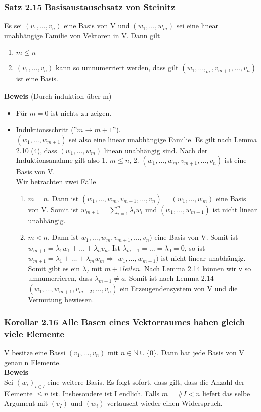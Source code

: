 \documentclass{scrartcl}
\newcommand{\lb}{\lambda}
\newcommand{\N}{\mathbb{N}}
\begin{document}
\subsubsection{Satz 2.15 Basisaustauschsatz von Steinitz}
Es sei \((v_1, \dots, v_n)\) eine Basis von V und \((w_1, \dots, w_m)\) sei eine linear unabh\"angige Familie von Vektoren in V. Dann gilt
\begin{enumerate}
\item{\(m \le n\)}
\item{\((v_1, \dots, v_n)\) kann so umnumerriert werden, dass gilt \((w_1, \dots, _m, v_{m + 1}, \dots, v_n)\) ist eine Basis.}
\end{enumerate}
\textbf{Beweis} (Durch induktion \"uber m)\\
\begin{itemize}
\item{F\"ur \(m = 0\) ist nichts zu zeigen.}
\item{Induktionsschritt (''\(m \to m + 1\)'').\\
\((w_1, \dots, w_{m+1})\) sei also eine linear unabh\"angige Familie. Es gilt nach Lemma 2.10 (4), dass \((w_1, \dots, w_m)\) linean unabh\"angig sind. Nach der Induktionsanahme gilt also 1. \(m \le n\), 2. \((w_1, \dots, w_m, v_{m+1}, \dots, v_n)\) ist eine Basis von V.\\
Wir betrachten zwei F\"alle
\begin{enumerate}
\item{\(m = n\). Dann ist \((w_1, \dots, w_m, v_{m+1}, \dots, v_n) = (w_1, \dots, w_m)\) eine Basis von V. Somit ist \(w_{m + 1} = \sum_{i = 1}^n \lb_i w_i\) und \((w_1, \dots, w_{m+1})\) ist nicht linear unabh\"angig.}
\item{\(m < n\). Dann ist \(w_1, \dots, w_m, v_{m+1}, \dots, v_n)\) eine Basis von V. Somit ist \(w_{m+1} = \lb_1w_1 + \dots + \lb_n v_n\). Ist \(\lb_{m+1} = \dots = \lb_0 = 0\), so ist \(w_{m+1} = \lb_1 + \dots + \lb_mw_m \Rightarrow\) \(w_1, \dots, w_{m+1})\) ist nicht linear unabh\"angig. Somit gibt es ein \(\lb_I\) mit \(m+1 
le i 
le n\). Nach Lemma 2.14 k\"onnen wir v so umnumerrieren, dass \(\lb_{m+1} \neq a\). Somit ist nach Lemma 2.14 \((w_1, \dots, w_{m+1}, v_{m+2}, \dots, v_n)\) ein Erzeugendensystem von V und die Vermutung bewiesen.}
\end{enumerate}
}
\end{itemize}

\subsubsection{Korollar 2.16 Alle Basen eines Vektorraumes haben gleich viele Elemente}
V besitze eine Bassi \((v_1, \dots, v_n)\) mit \(n \in \N \cup \{0\}\). Dann hat jede Basis von V genau n Elemente.\\
\textbf{Beweis}\\
Sei \((w_i)_{i \in I}\) eine weitere Basis. Es folgt sofort, dass gilt, dass die Anzahl der Elemente \(\le n\) ist. Insbesondere ist I endlich. Falls \(m = \#I < n\) liefert das selbe Argument mit \((v_I)\) und \((w_i)\) vertauscht wieder einen Widerspruch.
\end{document}

